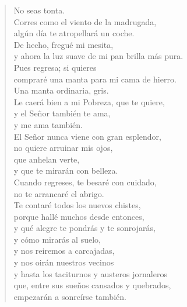 \documentclass[11pt]{extbook}
\newcommand*{\centeredornament}{\centerline{\pgfornament[width=6cm]{88}}}
\begin{document}
\begin{verse}
  No seas tonta. \\
  Corres como el viento de la madrugada, \\
  algún día te atropellará un coche. \\
  De hecho, fregué mi mesita, \\
  y ahora la luz suave de mi pan brilla más pura.\hspace*{-1mm} \\
  Pues regresa; si quieres \\
  compraré una manta para mi cama de hierro. \\
  Una manta ordinaria, gris. \\
  Le caerá bien a mi Pobreza, que te quiere, \\
  y el Señor también te ama, \\
  y me ama también. \\
  El Señor nunca viene con gran esplendor, \\
  no quiere arruinar mis ojos, \\
  que anhelan verte, \\
  y que te mirarán con belleza. \\
  Cuando regreses, te besaré con cuidado, \\
  no te arrancaré el abrigo. \\
  Te contaré todos los nuevos chistes, \\
  porque hallé muchos desde entonces, \\
  y qué alegre te pondrás y te sonrojarás, \\
  y cómo mirarás al suelo, \\
  y nos reiremos a carcajadas, \\
  y nos oirán nuestros vecinos \\
  y hasta los taciturnos y austeros jornaleros \\
  que, entre sus sueños cansados y quebrados, \\
  empezarán a sonreírse también.
\end{verse}

\newpage

\vspace*{-15mm}
\centeredornament


\end{document}
